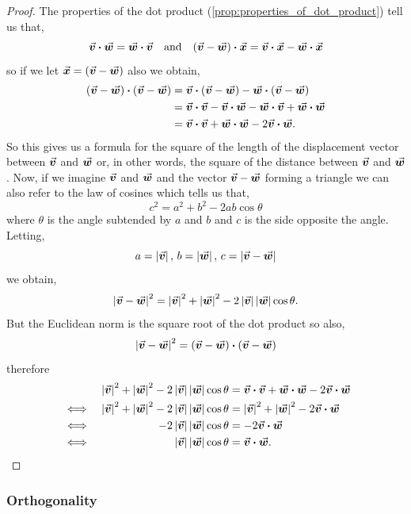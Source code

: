 \documentclass[MathsNotesBase.tex]{subfiles}
\begin{document}
{	\bigskip
	\begin{proof}
		The properties of the dot product (\autoref{prop:properties_of_dot_product}) tell us that,
		\[ \v\dotprod\w = \w\dotprod\v \eqand (\v - \w)\dotprod\x = \v\dotprod\x - \w\dotprod\x \]
		so if we let ${ \x = (\v - \w) }$ also we obtain,
		\begin{align*}
		(\v - \w)\dotprod(\v - \w) &= \v\dotprod(\v - \w) - \w\dotprod(\v - \w)  \\
								   &= \v\dotprod\v - \v\dotprod\w - \w\dotprod\v + \w\dotprod\w \\
								   &= \v\dotprod\v + \w\dotprod\w - 2\v\dotprod\w. 
		\end{align*}
		So this gives us a formula for the square of the length of the displacement vector between $\v$ and $\w$ or, in other words, the square of the distance between $\v$ and $\w$. Now, if we imagine $\v$ and $\w$ and the vector $\v - \w$ forming a triangle we can also refer to the law of cosines which tells us that,
		\[ c^2 = a^2 + b^2 - 2ab\cos{\theta} \]
		where $\theta$ is the angle subtended by $a$ and $b$ and $c$ is the side opposite the angle. Letting,
		\[ a = \norm\v,\, b = \norm\w,\, c = \norm{\v - \w} \]
		we obtain,
		\[ \norm{\v - \w}^2 = \norm\v^2 + \norm\w^2 - 2\norm\v\norm\w\cos{\theta}. \]
		But the Euclidean norm is the square root of the dot product so also,
		\[ \norm{\v - \w}^2 = (\v - \w)\dotprod(\v - \w) \]
		therefore
		\begin{align*}
		&&  \norm\v^2 + \norm\w^2 - 2\norm\v\norm\w\cos{\theta} &= \v\dotprod\v + \w\dotprod\w - 2\v\dotprod\w \\
		&\iff & \norm\v^2 + \norm\w^2 - 2\norm\v\norm\w\cos{\theta} &= \norm\v^2 + \norm\w^2 - 2\v\dotprod\w \\
		&\iff & - 2\norm\v\norm\w\cos{\theta} &= - 2\v\dotprod\w \\
		&\iff & \norm\v\norm\w\cos{\theta} &= \v\dotprod\w. \qedhere \\
		\end{align*}
	\end{proof}

	\medskip{}

	\bigskip
	\subsubsection{Orthogonality}\label{sssection:orthogonality}

}
\end{document}
